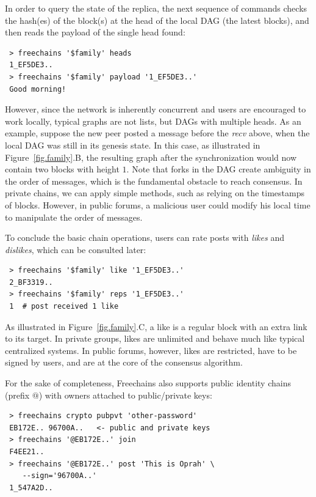 \documentclass[10pt,journal,compsoc]{IEEEtran}
\newcommand{\FC}       {Freechains\xspace}
\begin{document}
In order to query the state of the replica, the next sequence of commands
checks the hash(es) of the block(s) at the head of the local DAG (the latest
blocks), and then reads the payload of the single head found:

{\footnotesize
\begin{verbatim}
 > freechains '$family' heads
 1_EF5DE3..
 > freechains '$family' payload '1_EF5DE3..'
 Good morning!
\end{verbatim}
}

However, since the network is inherently concurrent and users are encouraged to
work locally, typical graphs are not lists, but DAGs with multiple heads.
As an example, suppose the new peer posted a message before the \emph{recv}
above, when the local DAG was still in its genesis state.
In this case, as illustrated in Figure~\ref{fig.family}.B, the resulting graph
after the synchronization would now contain two blocks with height $1$.
%
Note that forks in the DAG create ambiguity in the order of messages, which is
the fundamental obstacle to reach consensus.
In private chains, we can apply simple methods, such as relying on the
timestamps of blocks.
However, in public forums, a malicious user could modify his local time to
manipulate the order of messages.

To conclude the basic chain operations, users can rate posts with \emph{likes}
and \emph{dislikes}, which can be consulted later:

{\footnotesize
\begin{verbatim}
 > freechains '$family' like '1_EF5DE3..'
 2_BF3319..
 > freechains '$family' reps '1_EF5DE3..'
 1  # post received 1 like
\end{verbatim}
}

As illustrated in Figure~\ref{fig.family}.C, a like is a regular block with an
extra link to its target.
In private groups, likes are unlimited and behave much like typical centralized
systems.
In public forums, however, likes are restricted, have to be signed by users,
and are at the core of the consensus algorithm.

For the sake of completeness, \FC also supports public identity chains (prefix
$@$) with owners attached to public/private keys:

{\footnotesize
\begin{verbatim}
 > freechains crypto pubpvt 'other-password'
 EB172E.. 96700A..   <- public and private keys
 > freechains '@EB172E..' join
 F4EE21..
 > freechains '@EB172E..' post 'This is Oprah' \
    --sign='96700A..'
 1_547A2D..
\end{verbatim}
}
\end{document}
